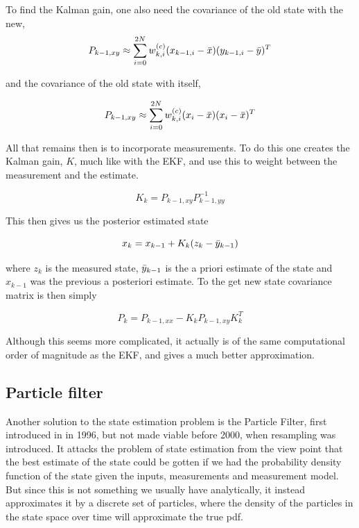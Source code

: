 To find the Kalman gain, one also need the covariance of the old state with the new, 
\begin{equation}
    P_{k-1, xy} \approx \sum_{i=0}^{2N} w_{k,i}^{(c)}(x_{k-1,i} - \Bar{x})(y_{k-1,i} - \Bar{y})^T
\end{equation}

and the covariance of the old state with itself,

\begin{equation}
    P_{k-1,xy} \approx \sum_{i=0}^{2N}w_{k,i}^{(c)}(x_i - \Bar{x})(x_i - \Bar{x})^T
\end{equation}

All that remains then is to incorporate measurements. To do this one creates the Kalman gain, $K$, much like with the EKF, and use this to weight between the measurement and the estimate.

\begin{equation}
    K_k = P_{k-1,xy}P_{k-1,yy}^{-1}
\end{equation}

This then gives us the posterior estimated state

\begin{equation}
    x_k = x_{k-1} + K_k(z_k - \Bar{y}_{k-1})
\end{equation}

where $z_k$ is the measured state, $\Bar{y}_{k-1}$ is the a priori estimate of the state and $x_{k-1}$ was the previous a posteriori estimate. To the get new state covariance matrix is then simply

\begin{equation}
    P_k = P_{k-1,xx} - K_kP_{k-1,xy}K_k^T
\end{equation}

Although this seems more complicated, it actually is of the same computational order of magnitude as the EKF, and gives a much better approximation.

\subsection{Particle filter}
Another solution to the state estimation problem is the Particle Filter, first introduced in \cite{ParticleFilter} in 1996, but not made viable before 2000, when resampling was introduced\cite{ParticleResampling}. It attacks the problem of state estimation from the view point that the best estimate of the state could be gotten if we had the probability density function of the state given the inputs, measurements and measurement model. But since this is not something we usually have analytically, it instead approximates it by a discrete set of particles, where the density of the particles in the state space over time will approximate the true pdf. 


